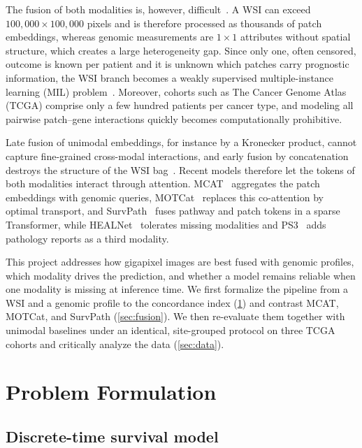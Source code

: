 \documentclass[10pt,twocolumn,letterpaper]{article}
\begin{document}
The fusion of both modalities is, however, difficult~\cite{chen2021mcat,jaume2024survpath}. A WSI can exceed $100{,}000\times100{,}000$ pixels and is therefore processed as thousands of patch embeddings, whereas genomic measurements are $1\times1$ attributes without spatial structure, which creates a large heterogeneity gap. Since only one, often censored, outcome is known per patient and it is unknown which patches carry prognostic information, the WSI branch becomes a weakly supervised multiple-instance learning (MIL) problem~\cite{ilse2018attention}. Moreover, cohorts such as The Cancer Genome Atlas (TCGA) comprise only a few hundred patients per cancer type, and modeling all pairwise patch--gene interactions quickly becomes computationally prohibitive.

Late fusion of unimodal embeddings, for instance by a Kronecker product, cannot capture fine-grained cross-modal interactions, and early fusion by concatenation destroys the structure of the WSI bag~\cite{hemker2024healnet,raza2025ps3}. Recent models therefore let the tokens of both modalities interact through attention. MCAT~\cite{chen2021mcat} aggregates the patch embeddings with genomic queries, MOTCat~\cite{xu2023motcat} replaces this co-attention by optimal transport, and SurvPath~\cite{jaume2024survpath} fuses pathway and patch tokens in a sparse Transformer, while HEALNet~\cite{hemker2024healnet} tolerates missing modalities and PS3~\cite{raza2025ps3} adds pathology reports as a third modality.

This project addresses how gigapixel images are best fused with genomic profiles, which modality drives the prediction, and whether a model remains reliable when one modality is missing at inference time. We first formalize the pipeline from a WSI and a genomic profile to the concordance index (\cref{sec:formulation}) and contrast MCAT, MOTCat, and SurvPath (\cref{sec:fusion}). We then re-evaluate them together with unimodal baselines under an identical, site-grouped protocol on three TCGA cohorts and critically analyze the data (\cref{sec:data}).

\section{Problem Formulation}
\label{sec:formulation}

\subsection{Discrete-time survival model}
\label{sec:survival}
\end{document}
